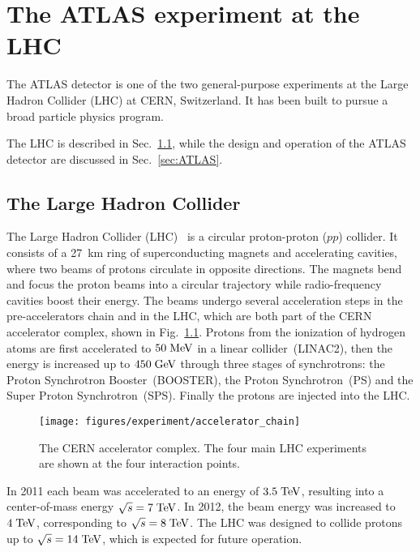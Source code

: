 \chapter{The ATLAS experiment at the LHC}
\label{sec:experiment}

The ATLAS detector is one of the two general-purpose experiments 
at the Large Hadron Collider (LHC) at CERN, Switzerland.
It has been built to pursue a broad particle physics program. 

The LHC is described in Sec.~\ref{sec:LHC}, while the design and operation of the 
ATLAS detector are discussed in Sec.~\ref{sec:ATLAS}.

\section{The Large Hadron Collider}
\label{sec:LHC}

The Large Hadron Collider (LHC)~\cite{LHCreport12, *LHCreport3} 
is a circular proton-proton ($pp$) collider.
It consists of a 27~km ring of superconducting magnets and
accelerating cavities, where two beams of protons circulate in
opposite directions.
The magnets bend and focus the proton beams into a circular trajectory while radio-frequency
cavities boost their energy.
The beams undergo several acceleration steps in the pre-accelerators chain
and in the LHC, which are both part of the CERN accelerator complex, shown in Fig.~\ref{fig:lhc}.
Protons from the ionization of hydrogen atoms are first accelerated to \mbox{$50 \; \mathrm{MeV}$}
in a linear collider~(LINAC2), then the energy is increased up to
\mbox{$450 \; \mathrm{GeV}$} through three stages of synchrotrons: the Proton
Synchrotron Booster~(BOOSTER), the Proton Synchrotron~(PS) and the Super Proton Synchrotron~(SPS).
Finally the protons are injected into the LHC.

\begin{figure}[ht]
\begin{center}
\texttt{[image: figures/experiment/accelerator\_chain]}
\caption[CERN Accelerator complex]{
  The CERN accelerator complex. The four main LHC experiments are
  shown at the four interaction points.}
\label{fig:lhc}
\end{center}
\end{figure}
 
In 2011 each beam was accelerated to an energy of \mbox{$3.5 \; \mathrm{TeV}$}, 
resulting into a center-of-mass energy \mbox{$\sqrt{s} = 7 \; \mathrm{TeV}$}.
In 2012, the beam energy was increased to \mbox{$4 \; \mathrm{TeV}$}, 
corresponding to \mbox{$\sqrt{s} = 8 \; \mathrm{TeV}$}.
The LHC was designed to collide protons up to \mbox{$\sqrt{s} = 14 \; \mathrm{TeV}$},
which is expected for future operation.

